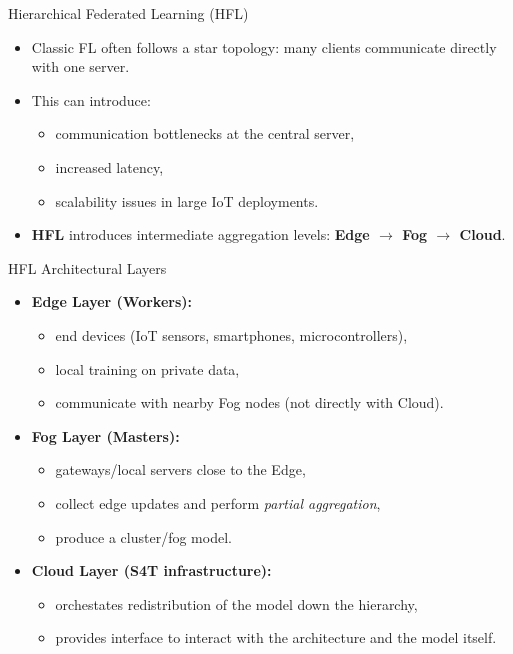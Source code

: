 \documentclass[aspectratio=169]{beamer}
\begin{document}
\begin{frame}{Hierarchical Federated Learning (HFL)}
\begin{itemize}
  \item Classic FL often follows a star topology: many clients communicate directly with one server.
  \item This can introduce:
  \begin{itemize}
    \item communication bottlenecks at the central server,
    \item increased latency,
    \item scalability issues in large IoT deployments.
  \end{itemize}
  \item \textbf{HFL} introduces intermediate aggregation levels: \textbf{Edge $\rightarrow$ Fog $\rightarrow$ Cloud}.
\end{itemize}
\end{frame}

\begin{frame}{HFL Architectural Layers}
\begin{itemize}
  \item \textbf{Edge Layer (Workers):}
  \begin{itemize}
    \item end devices (IoT sensors, smartphones, microcontrollers),
    \item local training on private data,
    \item communicate with nearby Fog nodes (not directly with Cloud).
  \end{itemize}
  \item \textbf{Fog Layer (Masters):}
  \begin{itemize}
    \item gateways/local servers close to the Edge,
    \item collect edge updates and perform \textit{partial aggregation},
    \item produce a cluster/fog model.
  \end{itemize}
  \item \textbf{Cloud Layer (S4T infrastructure):}
  \begin{itemize}
    \item orchestates redistribution of the model down the hierarchy,
    \item provides interface to interact with the architecture and the model itself.
  \end{itemize}
\end{itemize}
\end{frame}
\end{document}
